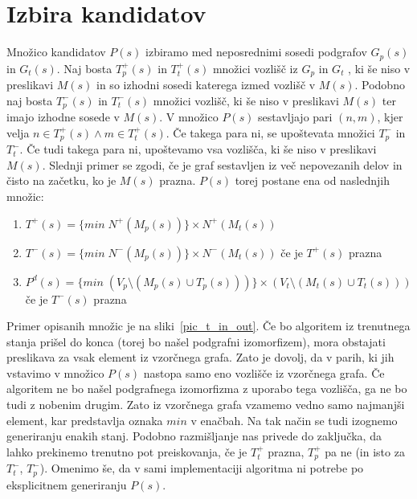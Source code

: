 \documentclass[a4paper, 12pt, ]{book}
\begin{document}
	\section{Izbira kandidatov}
	\label{vf2:candidate}
	
	Množico kandidatov $P(s)$ izbiramo med neposrednimi sosedi podgrafov $G_p(s)$ in $G_t(s)$. Naj bosta $T_p^+(s)$ in $T_t^+(s)$ množici vozlišč iz
	$G_p$ in $G_t$ , ki še niso v preslikavi $M(s)$ in so izhodni sosedi katerega izmed vozlišč v $M(s)$. Podobno naj bosta $T_p^-(s)$ in $T_t^-(s)$ množici
	vozlišč, ki še niso v preslikavi $M(s)$ ter imajo izhodne sosede v $M(s)$. V množico $P(s)$ sestavljajo pari $(n,m)$, kjer velja $n \in T_p^+(s) \wedge
	m \in T_t^+(s)$. Če takega para ni, se upoštevata množici $T_p^-$ in $T_t^-$. Če tudi takega para ni, upoštevamo vsa vozlišča, ki še niso v preslikavi
	$M(s)$. Slednji primer se zgodi, če je graf sestavljen iz več nepovezanih delov in čisto na začetku, ko je $M(s)$ prazna. $P(s)$ torej postane ena od
	naslednjih množic:
	\begin{enumerate}
	\item $T^+(s) = \{min\; N^+(M_p(s))\} \times N^+(M_t(s))$
	\item $T^-(s) = \{min\; N^-(M_p(s))\} \times N^-(M_t(s))$\;\;\; če je $T^+(s)$ prazna
	\item $P^d(s) = \{min\; (V_p \setminus (M_p(s) \cup T_p(s))) \}  \times (V_t \setminus (M_t(s) \cup T_t(s)) )$\;\;\; če je $T^-(s)$ prazna
	\end{enumerate}
	
	Primer opisanih množic je na sliki~\ref{pic_t_in_out}. Če bo algoritem iz trenutnega stanja prišel do konca (torej bo našel podgrafni izomorfizem), mora
	obstajati preslikava za vsak element iz vzorčnega grafa. Zato je dovolj, da v parih, ki jih vstavimo v množico $P(s)$ nastopa samo eno vozlišče iz
	vzorčnega grafa. Če algoritem ne bo našel podgrafnega izomorfizma z uporabo tega vozlišča, ga ne bo tudi z nobenim drugim. Zato iz vzorčnega grafa 
	vzamemo vedno samo najmanjši element, kar predstavlja oznaka $min$ v enačbah. Na tak način se tudi izognemo generiranju enakih stanj. Podobno 
	razmišljanje nas privede do zaključka, da lahko prekinemo trenutno pot preiskovanja, če je $T_t^+$ prazna, $T_p^+$ pa ne (in isto za $T_t^-$,
	$T_p^-$). 	Omenimo še, da v sami implementaciji algoritma ni potrebe po eksplicitnem generiranju $P(s)$.
	
\end{document}
